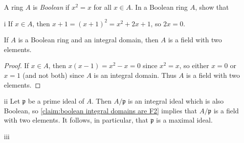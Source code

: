 \begin{exercise}
A ring \(A\) is \emph{Boolean} if \(x^2 = x\) for all \(x \in A\).
In a Boolean ring \(A\), show that
\end{exercise}

\begin{partsolution}{i}
If \(x \in A\), then \(x + 1 = \left(x + 1\right)^2 = x^2 + 2 x + 1\), so \(2 x = 0\).
\end{partsolution}

\begin{claim}
\label{claim:boolean integral domains are F2}
If \(A\) is a Boolean ring and an integral domain, then \(A\) is a field with two elements.
\end{claim}

\begin{proof}
If \(x \in A\), then \(x(x - 1) = x^2 - x = 0\) since \(x^2 = x\), so either \(x = 0\) or \(x = 1\) (and not both) since \(A\) is an integral domain.
Thus \(A\) is a field with two elements.
\end{proof}

\begin{partsolution}{ii}
Let \(\mathfrak{p}\) be a prime ideal of \(A\).
Then \(A / \mathfrak{p}\) is an integral ideal which is also Boolean, so \autoref{claim:boolean integral domains are F2} implies that \(A / \mathfrak{p}\) is a field with two elements.
It follows, in particular, that \(\mathfrak{p}\) is a maximal ideal.
\end{partsolution}

\begin{partsolution}{iii}

\end{partsolution}